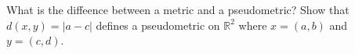 What is the diffeence between a metric and a pseudometric? Show that $d(x,y)=|a-c|$ defines a
pseudometric on $\mathbb{R}^2$ where $x=(a,b)$ and $y=(c,d)$.\\